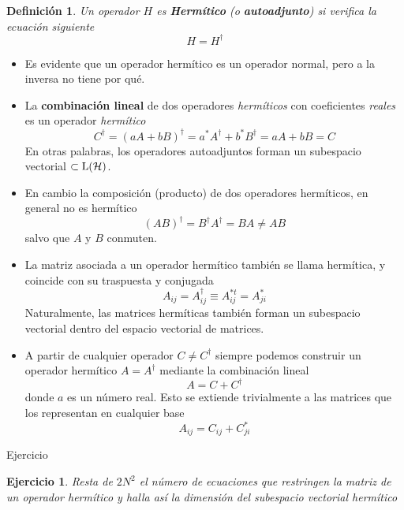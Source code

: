 \documentclass[a4paper,11pt]{book} %
\newtheorem{definicion_contador}{Definición}
\newcommand{\Definicion}[1]{
		\begin{mybox_gray2}{}
			\begin{definicion_contador}
				 #1 
			\end{definicion_contador} 
		\end{mybox_gray2}
	}
\newtheorem{ejercicio_contador}{Ejercicio}
\newcommand{\Ejercicio}[1]{
		\begin{mybox_gray}{Ejercicio} 
			\begin{ejercicio_contador}
				 #1 
			\end{ejercicio_contador} 
		\end{mybox_gray}
	}
\numberwithin{equation}{chapter}
\begin{document}
\Definicion{
Un operador  $H$ es \textbf{Hermítico} (o \textbf{autoadjunto})  si  verifica la ecuación siguiente
	\begin{equation}
	H = H^\dagger
	\end{equation}
}
\begin{itemize}
	\item Es evidente que un operador hermítico es un operador normal, pero a la inversa no tiene por qué.
	\item La \textbf{combinación lineal} de dos operadores \textit{hermíticos} con coeficientes \textit{reales} es un operador \textit{hermítico}
\begin{equation}
C^\dagger = (a A + b B)^\dagger = a^* A^\dagger + b^* B^\dagger = aA + b B = C
\end{equation}
En otras palabras, los operadores autoadjuntos forman un subespacio vectorial $\subset {\rm L}(\mathcal{H})$.

	\item En cambio la composición (producto) de dos operadores hermíticos, en general no es hermítico
	\begin{equation}
	(A B)^\dagger = B^\dagger A^\dagger = BA \neq AB
	\end{equation}
	salvo que $A$ y $B$ conmuten.
	
	\item La matriz asociada a un operador hermítico también se llama hermítica, y coincide con su traspuesta y conjugada
\begin{equation}
A_{ij} = A^\dagger_{ij} \equiv  A^{*t}_{ij} = A^*_{ji} 
\end{equation}
Naturalmente, las matrices hermíticas también forman un subespacio vectorial dentro del espacio vectorial de matrices. 
	\item A partir de cualquier operador $C\neq C^\dagger $ siempre podemos construir un operador hermítico $A=A^\dagger$ mediante la combinación lineal
\begin{equation}
A = C + C^\dagger
\end{equation}
donde $a$ es un número real. Esto se extiende trivialmente a las matrices que los representan en cualquier base
\begin{equation}
A_{ij} = C_{ij} + C_{ji}^*
\end{equation} 
\end{itemize}

	\Ejercicio{
	Resta de $2N^2$ el número de ecuaciones que restringen la matriz de un operador hermítico y halla así la dimensión del \textit{subespacio vectorial hermítico}
	}
	
\end{document}
